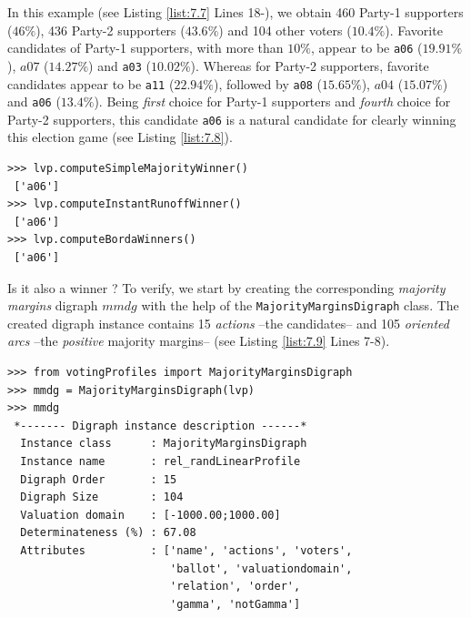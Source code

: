 In this example (see Listing \ref{list:7.7} Lines 18-), we obtain 460 Party-1 supporters ($46\%$), 436 Party-2 supporters ($43.6\%$) and 104 other voters ($10.4\%$). Favorite candidates of Party-1 supporters, with more than $10\%$, appear to be \texttt{a06} ($19.91\%$), $a07$ ($14.27\%$) and \texttt{a03} ($10.02\%$). Whereas for Party-2 supporters, favorite candidates appear to be \texttt{a11} ($22.94\%$), followed by \texttt{a08} ($15.65\%$), $a04$ ($15.07\%$) and \texttt{a06} ($13.4\%$). Being \emph{first} choice for Party-1 supporters and \emph{fourth} choice for Party-2 supporters, this candidate \texttt{a06} is a natural candidate for clearly winning this election game (see Listing \ref{list:7.8}).
\begin{lstlisting}[caption={The uninominal and \Borda election winner},label=list:7.8]
>>> lvp.computeSimpleMajorityWinner()
 ['a06']
>>> lvp.computeInstantRunoffWinner()
 ['a06']  
>>> lvp.computeBordaWinners()
 ['a06']
\end{lstlisting}

Is it also a \Condorcet winner ? To verify, we start by creating the corresponding \emph{majority margins} digraph $mmdg$ with the help of the \texttt{MajorityMarginsDigraph} class. The created digraph instance contains 15 \emph{actions} --the candidates-- and 105 \emph{oriented arcs} --the \emph{positive} majority margins-- (see Listing \ref{list:7.9} Lines 7-8).
\begin{lstlisting}[caption={A majority margins digraph constructed from a linear voting profile},label=list:7.9]
>>> from votingProfiles import MajorityMarginsDigraph
>>> mmdg = MajorityMarginsDigraph(lvp)
>>> mmdg
 *------- Digraph instance description ------*
  Instance class      : MajorityMarginsDigraph
  Instance name       : rel_randLinearProfile
  Digraph Order       : 15
  Digraph Size        : 104
  Valuation domain    : [-1000.00;1000.00]
  Determinateness (%) : 67.08
  Attributes          : ['name', 'actions', 'voters',
                         'ballot', 'valuationdomain',
                         'relation', 'order',
                         'gamma', 'notGamma']
\end{lstlisting}

